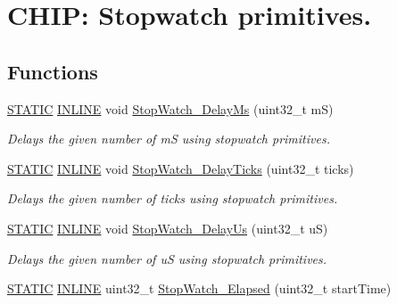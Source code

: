 \hypertarget{group__Stop__Watch}{}\section{C\+H\+IP\+: Stopwatch primitives.}
\label{group__Stop__Watch}
\subsection*{Functions}
\begin{DoxyCompactItemize}
\item 
\hyperlink{group__LPC__Types__Public__Macros_ga10b2d890d871e1489bb02b7e70d9bdfb}{S\+T\+A\+T\+IC} \hyperlink{group__LPC__Types__Public__Types_ga2eb6f9e0395b47b8d5e3eeae4fe0c116}{I\+N\+L\+I\+NE} void \hyperlink{group__Stop__Watch_gaa3bfba465962b310e4a5bd18292e8f87}{Stop\+Watch\+\_\+\+Delay\+Ms} (uint32\+\_\+t mS)
\begin{DoxyCompactList}\small\item\em Delays the given number of mS using stopwatch primitives. \end{DoxyCompactList}\item 
\hyperlink{group__LPC__Types__Public__Macros_ga10b2d890d871e1489bb02b7e70d9bdfb}{S\+T\+A\+T\+IC} \hyperlink{group__LPC__Types__Public__Types_ga2eb6f9e0395b47b8d5e3eeae4fe0c116}{I\+N\+L\+I\+NE} void \hyperlink{group__Stop__Watch_ga744f358982209fe277eb21843e88a2d9}{Stop\+Watch\+\_\+\+Delay\+Ticks} (uint32\+\_\+t ticks)
\begin{DoxyCompactList}\small\item\em Delays the given number of ticks using stopwatch primitives. \end{DoxyCompactList}\item 
\hyperlink{group__LPC__Types__Public__Macros_ga10b2d890d871e1489bb02b7e70d9bdfb}{S\+T\+A\+T\+IC} \hyperlink{group__LPC__Types__Public__Types_ga2eb6f9e0395b47b8d5e3eeae4fe0c116}{I\+N\+L\+I\+NE} void \hyperlink{group__Stop__Watch_ga3bc7706d1a9cb32888f82b2874c3655c}{Stop\+Watch\+\_\+\+Delay\+Us} (uint32\+\_\+t uS)
\begin{DoxyCompactList}\small\item\em Delays the given number of uS using stopwatch primitives. \end{DoxyCompactList}\item 
\hyperlink{group__LPC__Types__Public__Macros_ga10b2d890d871e1489bb02b7e70d9bdfb}{S\+T\+A\+T\+IC} \hyperlink{group__LPC__Types__Public__Types_ga2eb6f9e0395b47b8d5e3eeae4fe0c116}{I\+N\+L\+I\+NE} uint32\+\_\+t \hyperlink{group__Stop__Watch_ga0a0b6b9a4391ae5f4fcccb22a2a35f73}{Stop\+Watch\+\_\+\+Elapsed} (uint32\+\_\+t start\+Time)

\end{DoxyCompactItemize}
